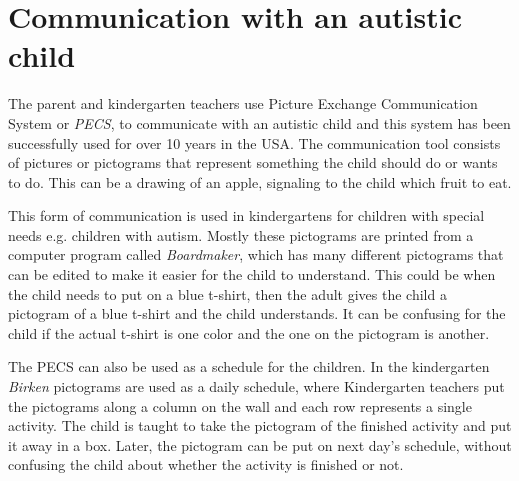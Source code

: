 \section{Communication with an autistic child}
The parent and kindergarten teachers use Picture Exchange Communication System or \emph{PECS}, to communicate with an autistic child and this system has been successfully used for over 10 years in the USA\cite{centerAutism}. The communication tool consists of pictures or pictograms that represent something the child should do or wants to do. This can be a drawing of an apple, signaling to the child which fruit to eat. 

This form of communication is used in kindergartens for children with special needs e.g. children with autism. Mostly these pictograms are printed from a computer program called \emph{Boardmaker}, which has many different pictograms that can be edited to make it easier for the child to understand\cite{centerAutism}. This could be when the child needs to put on a blue t-shirt, then the adult gives the child a pictogram of a blue t-shirt and the child understands. It can be confusing for the child if the actual t-shirt is one color and the one on the pictogram is another.

The PECS can also be used as a schedule for the children. In the kindergarten \emph{Birken} pictograms are used as a daily schedule, where Kindergarten teachers put the pictograms along a column on the wall and each row represents a single activity.
The child is taught to take the pictogram of the finished activity and put it away in a box. Later, the pictogram can be put on next day's schedule, without confusing the child about whether the activity is finished or not.
